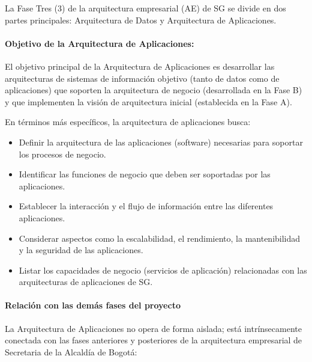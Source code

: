\documentclass[
	a4paper, %
	12pt, %
]{include/CSSullivanBusinessReport}
\def\tightlist{}
\begin{document}
La Fase Tres (3) de la arquitectura empresarial (AE) de SG se divide en
dos partes principales: Arquitectura de Datos y Arquitectura de
Aplicaciones.

\paragraph{Objetivo de la Arquitectura de
Aplicaciones:}\label{sec:objetivo-de-la-arquitectura-de-aplicaciones}

El objetivo principal de la Arquitectura de Aplicaciones es desarrollar
las arquitecturas de sistemas de información objetivo (tanto de datos
como de aplicaciones) que soporten la arquitectura de negocio
(desarrollada en la Fase B) y que implementen la visión de arquitectura
inicial (establecida en la Fase A).

En términos más específicos, la arquitectura de aplicaciones busca:

\begin{itemize}
\tightlist
\item
  Definir la arquitectura de las aplicaciones (software) necesarias para
  soportar los procesos de negocio.
\item
  Identificar las funciones de negocio que deben ser soportadas por las
  aplicaciones.
\item
  Establecer la interacción y el flujo de información entre las
  diferentes aplicaciones.
\item
  Considerar aspectos como la escalabilidad, el rendimiento, la
  mantenibilidad y la seguridad de las aplicaciones.
\item
  Listar los capacidades de negocio (servicios de aplicación)
  relacionadas con las arquitecturas de aplicaciones de SG.
\end{itemize}

\paragraph{Relación con las demás fases del
proyecto}\label{sec:relaciuxf3n-con-las-demuxe1s-fases-del-proyecto}

La Arquitectura de Aplicaciones no opera de forma aislada; está
intrínsecamente conectada con las fases anteriores y posteriores de la
arquitectura empresarial de Secretaria de la Alcaldía de Bogotá:
\end{document}
